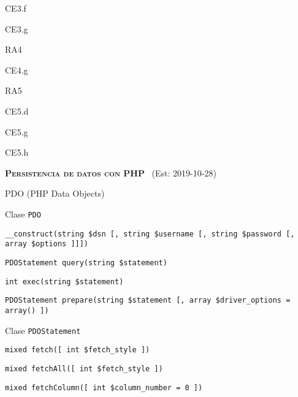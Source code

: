 \begin{longenum}
\begin{longenum}
\begin{longenum}
\begin{longenum}
\begin{longenum}
                    \item CE3.f
                    \item CE3.g
                \end{longenum}
                \item RA4
                \begin{longenum}
                    \item CE4.g
                \end{longenum}
                \item RA5
                \begin{longenum}
                    \item CE5.d
                    \item CE5.g
                    \item CE5.h
                \end{longenum}
            \end{longenum}
        \end{longenum}
    \end{longenum}
    \item \textbf{\textsc{Persistencia de datos con PHP}} \ (Est: 2019-10-28)
    \begin{longenum}
        \item PDO (PHP Data Objects)
        \begin{longenum}
            \item Clase \texttt{PDO}
            \begin{longenum}
                \item \texttt{\_\_construct(string \$dsn [, string \$username [, string \$password [, array \$options ]]])}
                \item \texttt{PDOStatement query(string \$statement)}
                \item \texttt{int exec(string \$statement)}
                \item \texttt{PDOStatement prepare(string \$statement [, array \$driver\_options = array() ])}
            \end{longenum}
            \item Clase \texttt{PDOStatement}
            \begin{longenum}
                \item \texttt{mixed fetch([ int \$fetch\_style ])}
                \item \texttt{mixed fetchAll([ int \$fetch\_style ])}
                \item \texttt{mixed fetchColumn([ int \$column\_number = 0 ])}

\end{longenum}
\end{longenum}
\end{longenum}
\end{longenum}
